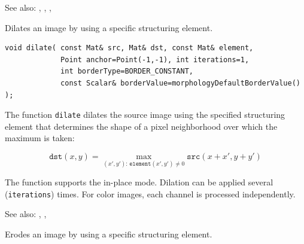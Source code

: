 See also: , , , 


\label{dilate}
Dilates an image by using a specific structuring element.

\begin{lstlisting}
void dilate( const Mat& src, Mat& dst, const Mat& element,
             Point anchor=Point(-1,-1), int iterations=1,
             int borderType=BORDER_CONSTANT,
             const Scalar& borderValue=morphologyDefaultBorderValue() );
\end{lstlisting}
\begin{description}
\end{description}

The function \texttt{dilate} dilates the source image using the specified structuring element that determines the shape of a pixel neighborhood over which the maximum is taken:

\[
\texttt{dst}(x,y) = \max_{(x',y'): \, \texttt{element}(x',y')\ne0}\texttt{src}(x+x',y+y')
\]

The function supports the in-place mode. Dilation can be applied several (\texttt{iterations}) times. For color images, each channel is processed independently.

See also: , , 

\label{erode}
Erodes an image by using a specific structuring element.

